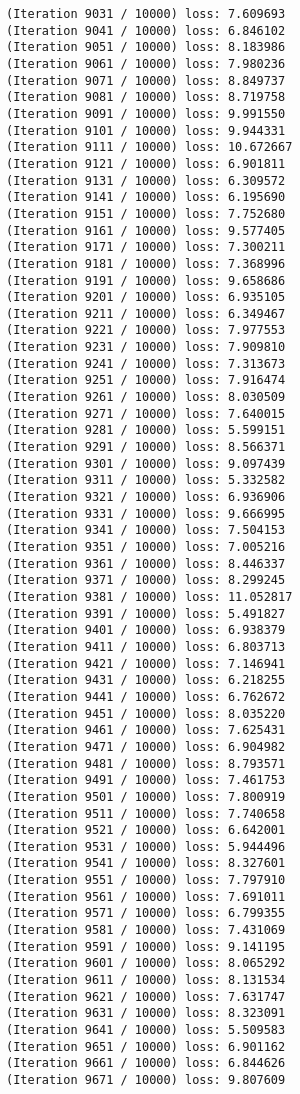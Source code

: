 \documentclass[11pt]{article}
\begin{document}
\begin{Verbatim}[commandchars=\\\{\}]
(Iteration 9031 / 10000) loss: 7.609693
(Iteration 9041 / 10000) loss: 6.846102
(Iteration 9051 / 10000) loss: 8.183986
(Iteration 9061 / 10000) loss: 7.980236
(Iteration 9071 / 10000) loss: 8.849737
(Iteration 9081 / 10000) loss: 8.719758
(Iteration 9091 / 10000) loss: 9.991550
(Iteration 9101 / 10000) loss: 9.944331
(Iteration 9111 / 10000) loss: 10.672667
(Iteration 9121 / 10000) loss: 6.901811
(Iteration 9131 / 10000) loss: 6.309572
(Iteration 9141 / 10000) loss: 6.195690
(Iteration 9151 / 10000) loss: 7.752680
(Iteration 9161 / 10000) loss: 9.577405
(Iteration 9171 / 10000) loss: 7.300211
(Iteration 9181 / 10000) loss: 7.368996
(Iteration 9191 / 10000) loss: 9.658686
(Iteration 9201 / 10000) loss: 6.935105
(Iteration 9211 / 10000) loss: 6.349467
(Iteration 9221 / 10000) loss: 7.977553
(Iteration 9231 / 10000) loss: 7.909810
(Iteration 9241 / 10000) loss: 7.313673
(Iteration 9251 / 10000) loss: 7.916474
(Iteration 9261 / 10000) loss: 8.030509
(Iteration 9271 / 10000) loss: 7.640015
(Iteration 9281 / 10000) loss: 5.599151
(Iteration 9291 / 10000) loss: 8.566371
(Iteration 9301 / 10000) loss: 9.097439
(Iteration 9311 / 10000) loss: 5.332582
(Iteration 9321 / 10000) loss: 6.936906
(Iteration 9331 / 10000) loss: 9.666995
(Iteration 9341 / 10000) loss: 7.504153
(Iteration 9351 / 10000) loss: 7.005216
(Iteration 9361 / 10000) loss: 8.446337
(Iteration 9371 / 10000) loss: 8.299245
(Iteration 9381 / 10000) loss: 11.052817
(Iteration 9391 / 10000) loss: 5.491827
(Iteration 9401 / 10000) loss: 6.938379
(Iteration 9411 / 10000) loss: 6.803713
(Iteration 9421 / 10000) loss: 7.146941
(Iteration 9431 / 10000) loss: 6.218255
(Iteration 9441 / 10000) loss: 6.762672
(Iteration 9451 / 10000) loss: 8.035220
(Iteration 9461 / 10000) loss: 7.625431
(Iteration 9471 / 10000) loss: 6.904982
(Iteration 9481 / 10000) loss: 8.793571
(Iteration 9491 / 10000) loss: 7.461753
(Iteration 9501 / 10000) loss: 7.800919
(Iteration 9511 / 10000) loss: 7.740658
(Iteration 9521 / 10000) loss: 6.642001
(Iteration 9531 / 10000) loss: 5.944496
(Iteration 9541 / 10000) loss: 8.327601
(Iteration 9551 / 10000) loss: 7.797910
(Iteration 9561 / 10000) loss: 7.691011
(Iteration 9571 / 10000) loss: 6.799355
(Iteration 9581 / 10000) loss: 7.431069
(Iteration 9591 / 10000) loss: 9.141195
(Iteration 9601 / 10000) loss: 8.065292
(Iteration 9611 / 10000) loss: 8.131534
(Iteration 9621 / 10000) loss: 7.631747
(Iteration 9631 / 10000) loss: 8.323091
(Iteration 9641 / 10000) loss: 5.509583
(Iteration 9651 / 10000) loss: 6.901162
(Iteration 9661 / 10000) loss: 6.844626
(Iteration 9671 / 10000) loss: 9.807609

\end{Verbatim}
\end{document}
